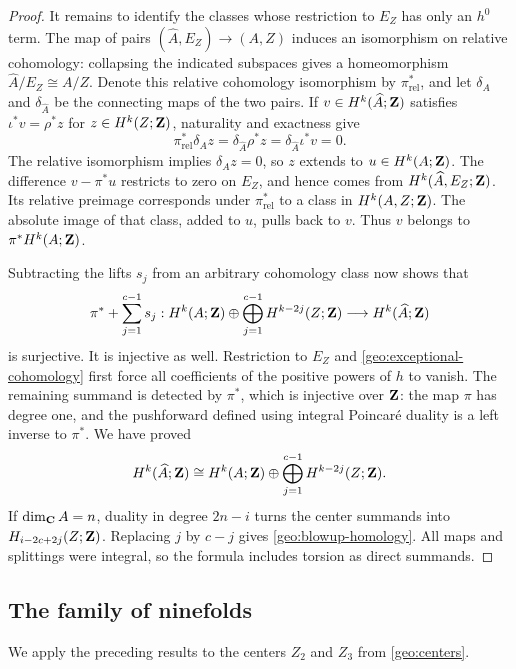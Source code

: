 \begin{proof}
It remains to identify the classes whose restriction to $E_Z$ has
only an $h^0$ term. The map of pairs
$(\widehat A,E_Z)\to(A,Z)$ induces an isomorphism on relative
cohomology: collapsing the indicated subspaces gives a homeomorphism
$\widehat A/E_Z\cong A/Z$. Denote this relative cohomology isomorphism
by $\pi_{\mathrm{rel}}^*$, and let $\delta_A$ and $\delta_{\widehat A}$
be the connecting maps of the two pairs. If
$v\in H^k(\widehat A;\mathbf Z)$ satisfies $\iota^*v=\rho^*z$ for
$z\in H^k(Z;\mathbf Z)$, naturality and exactness give
\[
 \pi_{\mathrm{rel}}^*\delta_Az
 =\delta_{\widehat A}\rho^*z
 =\delta_{\widehat A}\iota^*v=0.
\]
The relative isomorphism implies $\delta_Az=0$, so $z$ extends to
$u\in H^k(A;\mathbf Z)$. The difference $v-\pi^*u$ restricts to zero on
$E_Z$, and hence comes from $H^k(\widehat A,E_Z;\mathbf Z)$. Its relative
preimage corresponds under $\pi_{\mathrm{rel}}^*$ to a class in
$H^k(A,Z;\mathbf Z)$. The absolute image of that class, added to $u$, pulls
back to $v$. Thus $v$ belongs to $\pi^*H^k(A;\mathbf Z)$.

Subtracting the lifts $s_j$ from an arbitrary cohomology class now shows
that
\[
 \pi^*+\sum_{j=1}^{c-1}s_j:
 H^k(A;\mathbf Z)\oplus\bigoplus_{j=1}^{c-1}H^{k-2j}(Z;\mathbf Z)
 \longrightarrow H^k(\widehat A;\mathbf Z)
\]
is surjective. It is injective as well. Restriction to $E_Z$ and
\eqref{geo:exceptional-cohomology} first force all coefficients of the
positive powers of $h$ to vanish. The remaining summand is detected
by $\pi^*$, which is injective over $\mathbf Z$: the map $\pi$ has degree one,
and the pushforward defined using integral Poincar\'e duality is a left
inverse to $\pi^*$. We have proved
\begin{equation}
\label{geo:blowup-cohomology}
 H^k(\widehat A;\mathbf Z)\cong
 H^k(A;\mathbf Z)\oplus\bigoplus_{j=1}^{c-1}H^{k-2j}(Z;\mathbf Z).
\end{equation}
If $\dim_{\mathbf C}A=n$, duality in degree $2n-i$ turns the center summands
into $H_{i-2c+2j}(Z;\mathbf Z)$. Replacing $j$ by $c-j$ gives
\eqref{geo:blowup-homology}. All maps and splittings were integral, so
the formula includes torsion as direct summands.
\end{proof}

\subsection{The family of ninefolds}

We apply the preceding results to the centers $Z_2$ and $Z_3$ from
\eqref{geo:centers}.


